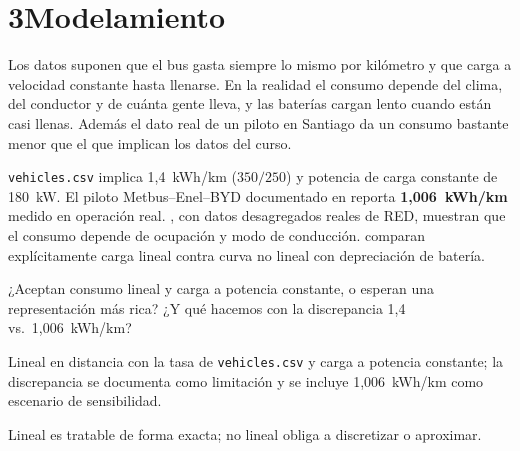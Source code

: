 \documentclass[11pt,a4paper,parskip=half]{scrartcl}
\begin{document}
\section*{3\quad Modelamiento}

\begin{campos}
\item[En simple] Los datos suponen que el bus gasta siempre lo mismo por kilómetro y que carga a velocidad constante hasta llenarse. En la realidad el consumo depende del clima, del conductor y de cuánta gente lleva, y las baterías cargan lento cuando están casi llenas. Además el dato real de un piloto en Santiago da un consumo bastante menor que el que implican los datos del curso.
\item[Evidencia] \texttt{vehicles.csv} implica 1{,}4~kWh/km ($350/250$) y potencia de carga constante de 180~kW. El piloto Metbus--Enel--BYD documentado en \citet{galarza_pilotstoscale_2020} reporta \textbf{1{,}006~kWh/km} medido en operación real. \citet{basso_disaggregatedenergy_2024}, con datos desagregados reales de RED, muestran que el consumo depende de ocupación y modo de conducción. \citet{vankootenniekerk_schedulingev_2017} comparan explícitamente carga lineal contra curva no lineal con depreciación de batería.
\item[Pregunta] ¿Aceptan consumo lineal y carga a potencia constante, o esperan una representación más rica? ¿Y qué hacemos con la discrepancia 1{,}4 vs.\ 1{,}006~kWh/km?
\item[Supuesto] Lineal en distancia con la tasa de \texttt{vehicles.csv} y carga a potencia constante; la discrepancia se documenta como limitación y se incluye 1{,}006~kWh/km como escenario de sensibilidad.
\item[Impacto] Lineal es tratable de forma exacta; no lineal obliga a discretizar o aproximar.
\end{campos}
\end{document}
